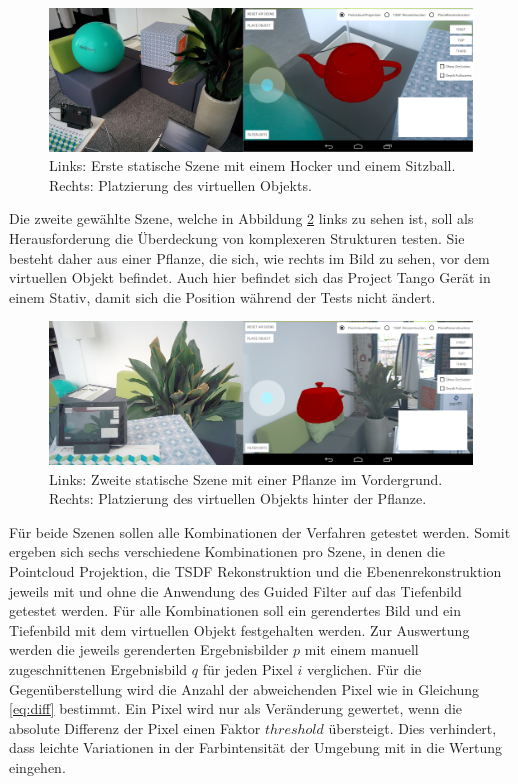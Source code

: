 \begin{figure}[h]
  \centering
	\includegraphics[width=1.0\textwidth]{content/images/evaluation/static-scene.png} 
  \caption{Links: Erste statische Szene mit einem Hocker und einem Sitzball. Rechts: Platzierung des virtuellen Objekts. }
  \label{fig:static-scene}
\end{figure}

Die zweite gewählte Szene, welche in Abbildung \ref{fig:plant-scene} links zu sehen ist, soll als Herausforderung die Überdeckung von komplexeren Strukturen testen. Sie besteht daher aus einer Pflanze, die sich, wie rechts im Bild zu sehen, vor dem virtuellen Objekt befindet. Auch hier befindet sich das Project Tango Gerät in einem Stativ, damit sich die Position während der Tests nicht ändert. 

\begin{figure}[h]
  \centering
	\includegraphics[width=1.0\textwidth]{content/images/evaluation/plant-scene.png} 
  \caption{Links: Zweite statische Szene mit einer Pflanze im Vordergrund. Rechts: Platzierung des virtuellen Objekts hinter der Pflanze. }
  \label{fig:plant-scene}
\end{figure}

Für beide Szenen sollen alle Kombinationen der Verfahren getestet werden. Somit ergeben sich sechs verschiedene Kombinationen pro Szene, in denen die Pointcloud Projektion, die TSDF Rekonstruktion und die Ebenenrekonstruktion jeweils mit und ohne die Anwendung des Guided Filter auf das Tiefenbild getestet werden. Für alle Kombinationen soll ein gerendertes Bild und ein Tiefenbild mit dem virtuellen Objekt festgehalten werden. Zur Auswertung werden die jeweils gerenderten Ergebnisbilder \(p\) mit einem manuell zugeschnittenen Ergebnisbild  \(q\) für jeden Pixel \(i\) verglichen. Für die Gegenüberstellung wird die Anzahl der abweichenden Pixel wie in Gleichung \ref{eq:diff} bestimmt. Ein Pixel wird nur als Veränderung gewertet, wenn die absolute Differenz der Pixel einen Faktor \(threshold\) übersteigt. Dies verhindert, dass leichte Variationen in der Farbintensität der Umgebung mit in die Wertung eingehen.

